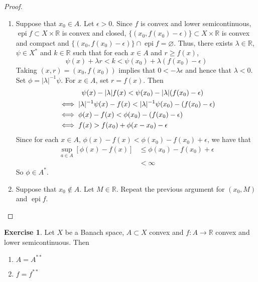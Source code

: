 \documentclass[12pt]{amsart}
\theoremstyle{definition}
\newtheorem{ex}[definition]{Exercise}
\newcommand{\lam}{\lambda}
\newcommand{\ep}{\epsilon}
\newcommand{\R}{\mathbb{R}}
\DeclareMathOperator{\epi}{epi}
\DeclareMathOperator*{\0}{\mbf{0}}
\DeclareMathOperator*{\1}{\mbf{1}}
\begin{document}
	\begin{proof}\
		\begin{enumerate}
			\item Suppose that $x_0 \in A$. Let $\ep >0$. Since $f$ is convex and lower semicontinuous, $\epi f \subset X \times \R$ is convex and closed, $\{(x_0, f(x_0) - \ep)\} \subset X \times \R$ is convex and compact and $\{(x_0, f(x_0) - \ep)\} \cap \epi f = \varnothing$. Thus, there exists $\lam \in \R$, $\psi \in X^*$ and $k \in \R$ such that for each $x \in A$ and $r \geq f(x)$, 
			$$\psi(x) + \lam r < k < \psi(x_0) + \lam (f(x_0) - \ep)$$
			Taking $(x, r) = (x_0, f(x_0))$ implies that $0 < -\lam \ep $ and hence that $\lam < 0$. Set $\phi = |\lam|^{-1}\psi$. For $x \in A$, set $r = f(x)$. Then 
			\begin{align*}
				& \hspace{1.2cm} \psi(x) -|\lam| f(x) < \psi(x_0) - |\lam| (f(x_0) - \ep) \\
				& \iff |\lam|^{-1} \psi(x) - f(x) < |\lam|^{-1}\psi(x_0) - (f(x_0) - \ep) \\
				& \iff \phi(x) - f(x) < \phi(x_0) - (f(x_0) - \ep) \\
				& \iff f(x) > f(x_0) + \phi(x-x_0) - \ep 
			\end{align*}
			Since for each $x \in A$, $\phi(x) - f(x) < \phi(x_0) - f(x_0) + \ep$, we have that 
			\begin{align*}
				\sup_{a \in A}[\phi(x) - f(x)] 
				& \leq \phi(x_0) - f(x_0) + \ep \\
				&< \infty
			\end{align*}
			So $\phi \in A^*$.
			\item Suppose that $x_0 \not \in A$. Let $M \in \R$. Repeat the previous argument for $(x_0, M)$ and $\epi f$.
		\end{enumerate}
	\end{proof}

	\begin{ex}
		Let $X$ be a Banach space, $A \subset X$ convex and $f:A \rightarrow \R$ convex and lower semicontinuous. Then 
		\begin{enumerate}
			\item $A = A^{**}$
			\item $f = f^{**}$
		\end{enumerate}
	\end{ex}
\end{document}
